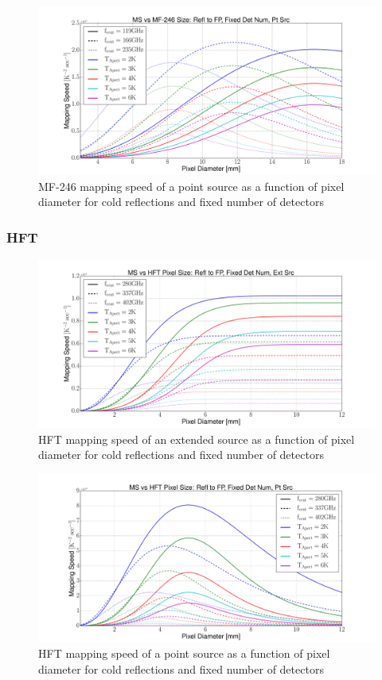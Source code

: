 \documentclass[12pt, titlepage]{article} %
\begin{document}
\begin{figure}[H]
	\centering
	\includegraphics[width=1.1\textwidth, center]{PDF/LFT_MS_MF-246_coldRefl_fixDetNum_ptSrc.pdf}
	\caption{MF-246 mapping speed of a point source as a function of pixel diameter for cold reflections and fixed number of detectors}
\end{figure}


\subsubsection{HFT}

\begin{figure}[H]
	\centering
	\includegraphics[width=1.1\textwidth, center]{PDF/HFT_MS_coldRefl_fixDetNum_extSrc.pdf}
	\caption{HFT mapping speed of an extended source as a function of pixel diameter for cold reflections and fixed number of detectors}
\end{figure}

\begin{figure}[H]
	\centering
	\includegraphics[width=1.1\textwidth, center]{PDF/HFT_MS_coldRefl_fixDetNum_ptSrc.pdf}
	\caption{HFT mapping speed of a point source as a function of pixel diameter for cold reflections and fixed number of detectors}
\end{figure}
\end{document}
